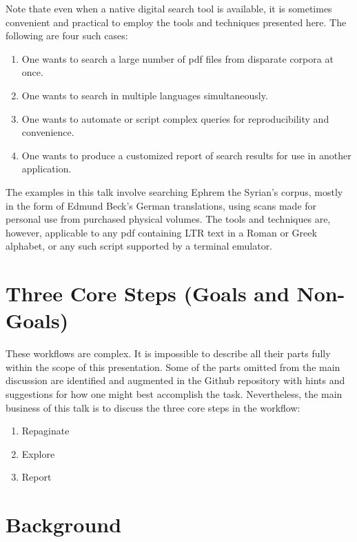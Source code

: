 \documentclass[
  letterpaper,
]{tufte-handout}
\providecommand{\tightlist}{%
  \setlength{\itemsep}{0pt}\setlength{\parskip}{0pt}}
\begin{document}
Note thate even when a native digital search tool is available, it is
sometimes convenient and practical to employ the tools and techniques
presented here. The following are four such cases:

\begin{enumerate}
\def\labelenumi{\arabic{enumi}.}
\tightlist
\item
  One wants to search a large number of pdf files from disparate corpora
  at once.
\item
  One wants to search in multiple languages simultaneously.
\item
  One wants to automate or script complex queries for reproducibility
  and convenience.
\item
  One wants to produce a customized report of search results for use in
  another application.
\end{enumerate}

The examples in this talk involve searching Ephrem the Syrian's corpus,
mostly in the form of Edmund Beck's German translations, using scans
made for personal use from purchased physical volumes. The tools and
techniques are, however, applicable to any pdf containing LTR text in a
Roman or Greek alphabet, or any such script supported by a terminal
emulator.

\section{Three Core Steps (Goals and
Non-Goals)}\label{three-core-steps-goals-and-non-goals}

These workflows are complex. It is impossible to describe all their
parts fully within the scope of this presentation. Some of the parts
omitted from the main discussion are identified and augmented in the
Github repository with hints and suggestions for how one might best
accomplish the task. Nevertheless, the main business of this talk is to
discuss the three core steps in the workflow:

\begin{enumerate}
\def\labelenumi{\arabic{enumi}.}
\tightlist
\item
  Repaginate
\item
  Explore
\item
  Report
\end{enumerate}

\section{Background}\label{background}
\end{document}
